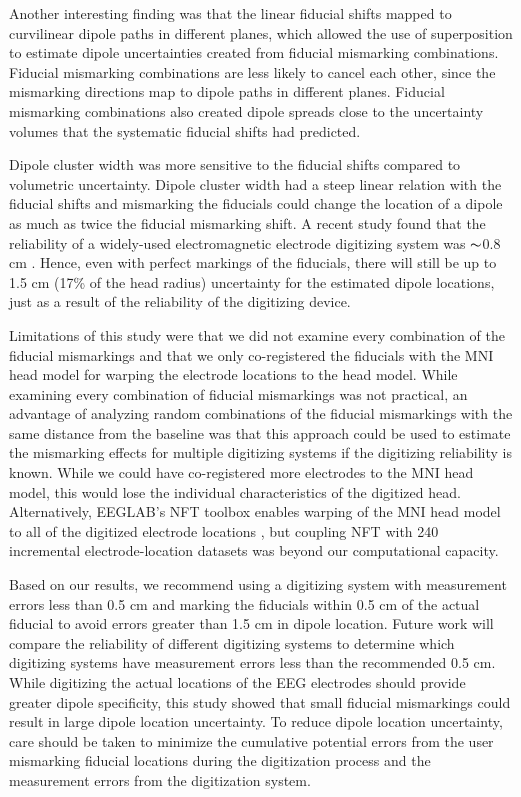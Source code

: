 \documentclass[../thesis_seyed.tex]{subfiles}
\begin{document}
Another interesting finding was that the linear fiducial shifts mapped to curvilinear dipole paths in different planes, which allowed the use of superposition to estimate dipole uncertainties created from fiducial mismarking combinations. Fiducial mismarking combinations are less likely to cancel each other, since the mismarking directions map to dipole paths in different planes. Fiducial mismarking combinations also created dipole spreads close to the uncertainty volumes that the systematic fiducial shifts had predicted. 

Dipole cluster width was more sensitive to the fiducial shifts compared to volumetric uncertainty. Dipole cluster width had a steep linear relation with the fiducial shifts and mismarking the fiducials could change the location of a dipole as much as twice the fiducial mismarking shift. A recent study found that the reliability of a widely-used electromagnetic electrode digitizing system was $\thicksim$0.8 cm \cite{Clausner2017-hv}. Hence, even with perfect markings of the fiducials, there will still be up to 1.5 cm (17\% of the head radius) uncertainty for the estimated dipole locations, just as a result of the reliability of the digitizing device.

Limitations of this study were that we did not examine every combination of the fiducial mismarkings and that we only co-registered the fiducials with the MNI head model for warping the electrode locations to the head model. While examining every combination of fiducial mismarkings was not practical, an advantage of analyzing random combinations of the fiducial mismarkings with the same distance from the baseline was that this approach could be used to estimate the mismarking effects for multiple digitizing systems if the digitizing reliability is known. While we could have co-registered more electrodes to the MNI head model, this would lose the individual characteristics of the digitized head. Alternatively, EEGLAB's NFT toolbox enables warping of the MNI head model to all of the digitized electrode locations \cite{Acar2010-ye}, but coupling NFT with 240 incremental electrode-location datasets was beyond our computational capacity. 

Based on our results, we recommend using a digitizing system with measurement errors less than 0.5 cm and marking the fiducials within 0.5 cm of the actual fiducial to avoid errors greater than 1.5 cm in dipole location. Future work will compare the reliability of different digitizing systems to determine which digitizing systems have measurement errors less than the recommended 0.5 cm. While digitizing the actual locations of the EEG electrodes should provide greater dipole specificity, this study showed that small fiducial mismarkings could result in large dipole location uncertainty. To reduce dipole location uncertainty, care should be taken to minimize the cumulative potential errors from the user mismarking fiducial locations during the digitization process and the measurement errors from the digitization system.


\end{document}
